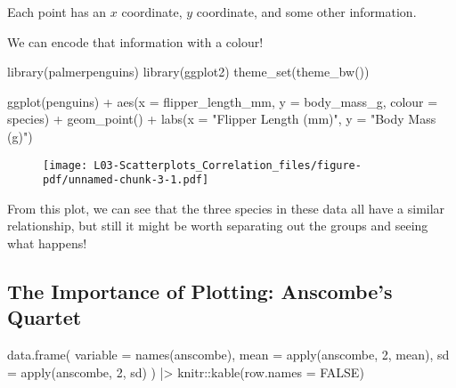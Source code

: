 \documentclass[
  letterpaper,
  DIV=11,
  numbers=noendperiod]{scrreprt}
\newenvironment{Shaded}{\begin{snugshade}}{\end{snugshade}}
\newcommand{\AttributeTok}[1]{\textcolor[rgb]{0.40,0.45,0.13}{#1}}
\newcommand{\ConstantTok}[1]{\textcolor[rgb]{0.56,0.35,0.01}{#1}}
\newcommand{\DecValTok}[1]{\textcolor[rgb]{0.68,0.00,0.00}{#1}}
\newcommand{\FunctionTok}[1]{\textcolor[rgb]{0.28,0.35,0.67}{#1}}
\newcommand{\NormalTok}[1]{\textcolor[rgb]{0.00,0.23,0.31}{#1}}
\newcommand{\SpecialCharTok}[1]{\textcolor[rgb]{0.37,0.37,0.37}{#1}}
\newcommand{\StringTok}[1]{\textcolor[rgb]{0.13,0.47,0.30}{#1}}
\begin{document}
\vspace{1cm}

Each point has an \(x\) coordinate, \(y\) coordinate, and some other
information.

We can encode that information with a colour!

\begin{Shaded}
\begin{Highlighting}[]
\FunctionTok{library}\NormalTok{(palmerpenguins)}
\FunctionTok{library}\NormalTok{(ggplot2)}
\FunctionTok{theme\_set}\NormalTok{(}\FunctionTok{theme\_bw}\NormalTok{())}

\FunctionTok{ggplot}\NormalTok{(penguins) }\SpecialCharTok{+} 
    \FunctionTok{aes}\NormalTok{(}\AttributeTok{x =}\NormalTok{ flipper\_length\_mm, }\AttributeTok{y =}\NormalTok{ body\_mass\_g,}
        \AttributeTok{colour =}\NormalTok{ species) }\SpecialCharTok{+}
    \FunctionTok{geom\_point}\NormalTok{() }\SpecialCharTok{+}
    \FunctionTok{labs}\NormalTok{(}\AttributeTok{x =} \StringTok{"Flipper Length (mm)"}\NormalTok{,}
        \AttributeTok{y =} \StringTok{"Body Mass (g)"}\NormalTok{)}
\end{Highlighting}
\end{Shaded}

\begin{figure}[H]

{\centering \texttt{[image: L03-Scatterplots\_Correlation\_files/figure-pdf/unnamed-chunk-3-1.pdf]}

}

\end{figure}

From this plot, we can see that the three species in these data all have
a similar relationship, but still it might be worth separating out the
groups and seeing what happens!

\hypertarget{the-importance-of-plotting-anscombes-quartet}{%
\subsection{The Importance of Plotting: Anscombe's
Quartet}\label{the-importance-of-plotting-anscombes-quartet}}

\begin{Shaded}
\begin{Highlighting}[]
\FunctionTok{data.frame}\NormalTok{(}
    \AttributeTok{variable =} \FunctionTok{names}\NormalTok{(anscombe),}
    \AttributeTok{mean =} \FunctionTok{apply}\NormalTok{(anscombe, }\DecValTok{2}\NormalTok{, mean),}
    \AttributeTok{sd =} \FunctionTok{apply}\NormalTok{(anscombe, }\DecValTok{2}\NormalTok{, sd)}
\NormalTok{) }\SpecialCharTok{|\textgreater{}}\NormalTok{ knitr}\SpecialCharTok{::}\FunctionTok{kable}\NormalTok{(}\AttributeTok{row.names =} \ConstantTok{FALSE}\NormalTok{)}
\end{Highlighting}
\end{Shaded}
\end{document}
